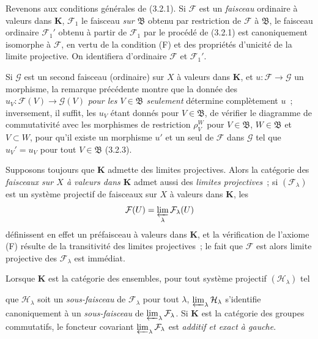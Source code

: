 \begin{env}[3.2.5]
\label{0.3.2.5-fr}
Revenons aux conditions générales de (3.2.1). Si $\mathcal{F}$ est un
\emph{faisceau} ordinaire à valeurs dans $\mathbf{K}$, $\mathcal{F}_1$ le
faisceau \emph{sur $\mathfrak{B}$} obtenu par restriction de $\mathcal{F}$ à
$\mathfrak{B}$, le faisceau ordinaire $\mathcal{F}_1'$ obtenu à partir de
$\mathcal{F}_1$ par le procédé de (3.2.1) est canoniquement isomorphe à
$\mathcal{F}$, en vertu de la condition (F) et des propriétés d'unicité de la
limite projective. On identifiera d'ordinaire $\mathcal{F}$ et
$\mathcal{F}_1'$.

Si $\mathcal{G}$ est un second faisceau (ordinaire) sur $X$ à valeurs dans
$\mathbf{K}$, et $u:\mathcal{F}\to\mathcal{G}$ un morphisme, la remarque
précédente montre que la donnée des
$u_V:\mathcal{F}(V)\to\mathcal{G}(V)$ \emph{pour les $V\in\mathfrak{B}$
seulement} détermine complètement $u$~; inversement, il suffit, les $u_V$
étant donnés pour $V\in\mathfrak{B}$, de vérifier le diagramme de commutativité
avec les morphismes de restriction $\rho_V^W$ pour $V\in\mathfrak{B}$,
$W\in\mathfrak{B}$ et $V\subset W$, pour qu'il existe un morphisme $u'$ et un
seul de $\mathcal{F}$ dans $\mathcal{G}$ tel que $u_V'=u_V$ pour tout
$V\in\mathfrak{B}$ (3.2.3).
\end{env}

\begin{env}[3.2.6]
\label{0.3.2.6-fr}
Supposons toujours que $\mathbf{K}$ admette des limites projectives. Alors la
catégorie des \emph{faisceaux sur $X$ à valeurs dans $\mathbf{K}$} admet aussi
des \emph{limites projectives}~; si $(\mathcal{F}_\lambda)$ est un système
projectif de faisceaux sur $X$ à valeurs dans $\mathbf{K}$, les
\[
  \mathcal{F}(U)=\varprojlim_\lambda\mathcal{F}_\lambda(U)
\]
définissent en effet un préfaisceau à valeurs dans $\mathbf{K}$, et la
vérification de l'axiome (F) résulte de la transitivité des limites
projectives~; le fait que $\mathcal{F}$ est alors limite projective des
$\mathcal{F}_\lambda$ est immédiat.

Lorsque $\mathbf{K}$ est la catégorie des ensembles, pour tout système
projectif $(\mathcal{H}_\lambda)$ tel


que $\mathcal{H}_\lambda$ soit un \emph{sous-faisceau} de
$\mathcal{F}_\lambda$ pour tout $\lambda$,
$\varprojlim_\lambda\mathcal{H}_\lambda$ s'identifie canoniquement à un
\emph{sous-faisceau} de $\varprojlim_\lambda\mathcal{F}_\lambda$. Si
$\mathbf{K}$ est la catégorie des groupes commutatifs, le foncteur covariant
$\varprojlim_\lambda\mathcal{F}_\lambda$ est \emph{additif et exact à gauche}.
\end{env}

